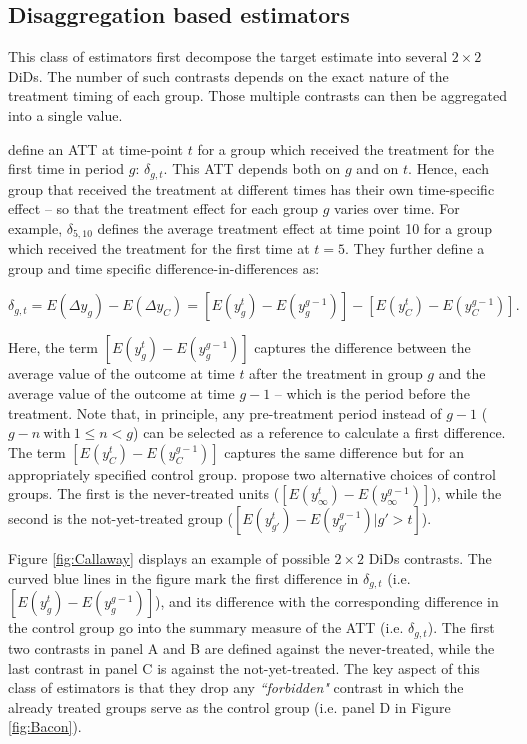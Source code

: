 \subsection{Disaggregation based estimators}

This class of estimators first decompose the target estimate into several  $2 \times 2$ DiDs. The number of such contrasts depends on the exact nature of the treatment timing of each group. Those multiple contrasts can then be aggregated into a single value. 

\textcite{Callaway.2020} define an ATT at time-point $t$ for a group which received the treatment for the first time in period $g$: $\delta_{g,t}$. This ATT depends both on $g$ and on $t$. Hence, each group that received the treatment at different times has their own time-specific effect -- so that the treatment effect for each group $g$ varies over time. For example, $\delta_{5,10}$ defines the average treatment effect at time point 10 for a group which received the treatment for the first time at $t=5$. They further define a group and time specific difference-in-differences as:

\begin{equation}
\label{eqn:callaway1}
\delta_{g,t} = E(\Delta y_{g}) - E(\Delta y_{C}) = [E(y_{g}^{t}) - E(y_{g}^{g-1})] - [E(y_{C}^{t}) - E(y_{C}^{g-1})].
\end{equation}

Here, the term $[E(y_{g}^{t}) - E(y_{g}^{g-1})]$ captures the difference between the average value of the outcome at time $t$ after the treatment in group $g$ and the average value of the outcome at time $g - 1$ -- which is the period before the treatment. Note that, in principle, any pre-treatment period instead of $g - 1$ ($g - n \ \text{with} \ 1 \leq n < g$) can be selected as a reference to calculate a first difference. The term $[E(y_{C}^{t}) - E(y_{C}^{g-1})]$ captures the same difference but for an appropriately specified control group. \textcite{Callaway.2020} propose two alternative choices of control groups. The first is the never-treated units ($[E(y_{\infty}^{t}) - E(y_{\infty}^{g-1})]$), while the second is the not-yet-treated group ($[E(y_{g'}^{t}) - E(y_{g'}^{g-1})|g'>t]$). 

Figure \ref{fig:Callaway} displays an example of possible $2 \times 2$ DiDs contrasts. The curved blue lines in the figure mark the first difference in $\delta_{g,t}$ (i.e. $[E(y_{g}^{t}) - E(y_{g}^{g-1})]$), and its difference with the corresponding difference in the control group go into the summary measure of the ATT (i.e. $\delta_{g,t}$). The first two contrasts in panel A and B are defined against the never-treated, while the last contrast in panel C is against the not-yet-treated. The key aspect of this class of estimators is that they drop any \emph{``forbidden"} contrast in which the already treated groups serve as the control group (i.e. panel D in Figure \ref{fig:Bacon}). 

